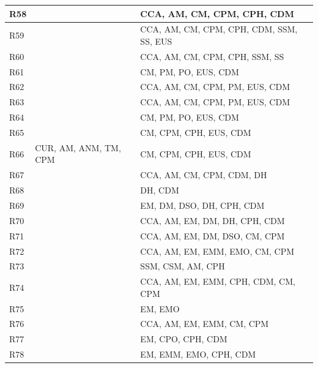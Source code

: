 \documentclass{Configuration_Files/PoliMi3i_thesis}
\begin{document}
\begin{xltabular}{\textwidth}{| >{}l | X | X |}
R58 & & CCA, AM, CM, CPM, CPH, CDM \B\\
\hline

R59 & & CCA, AM, CM, CPM, CPH, CDM, SSM, SS, EUS \B\\
\hline

R60 & & CCA, AM, CM, CPM, CPH, SSM, SS \B\\
\hline

R61 & & CM, PM, PO, EUS, CDM \B\\
\hline

R62 & & CCA, AM, CM, CPM, PM, EUS, CDM \B\\
\hline

R63 & & CCA, AM, CM, CPM, PM, EUS, CDM \B\\
\hline
    
R64 & & CM, PM, PO, EUS, CDM \B\\
\hline

R65 & & CM, CPM, CPH, EUS, CDM \B\\
\hline

R66 & CUR, AM, ANM, TM, CPM & CM, CPM, CPH, EUS, CDM \B\\
\hline

R67 & & CCA, AM, CM, CPM, CDM, DH \B\\
\hline

R68 & & DH, CDM \B\\
\hline

R69 & & EM, DM, DSO, DH, CPH, CDM \B\\
\hline

R70 & & CCA, AM, EM, DM, DH, CPH, CDM \B\\
\hline

R71 & & CCA, AM, EM, DM, DSO, CM, CPM \B\\
\hline
    
R72 & & CCA, AM, EM, EMM, EMO, CM, CPM \B\\
\hline

R73 & & SSM, CSM, AM, CPH \B\\
\hline
    
R74 & & CCA, AM, EM, EMM, CPH, CDM, CM, CPM \B\\
\hline 

R75 & & EM, EMO \B\\
\hline

R76 & & CCA, AM, EM, EMM, CM, CPM \B\\
\hline

R77 & & EM, CPO, CPH, CDM \B\\
\hline

R78 & & EM, EMM, EMO, CPH, CDM \B\\
\hline


\end{xltabular}
\end{document}
